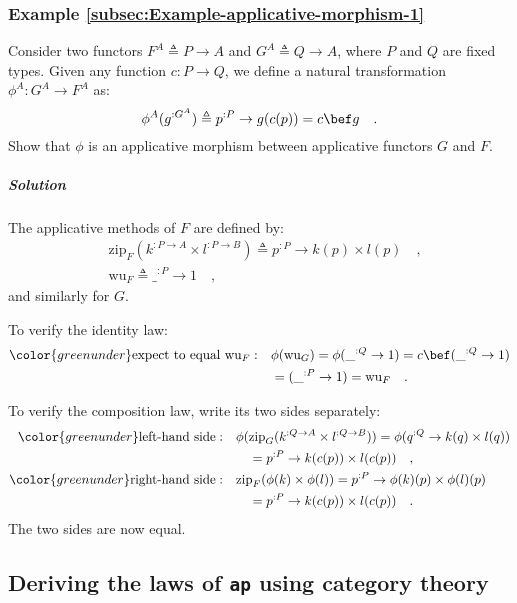 \subsubsection{Example \label{subsec:Example-applicative-morphism-1}\ref{subsec:Example-applicative-morphism-1}}

Consider two functors $F^{A}\triangleq P\rightarrow A$ and $G^{A}\triangleq Q\rightarrow A$,
where $P$ and $Q$ are fixed types. Given any function $c:P\rightarrow Q$,
we define a natural transformation $\phi^{A}:G^{A}\rightarrow F^{A}$
as:
\[
\phi^{A}(g^{:G^{A}})\triangleq p^{:P}\rightarrow g(c(p))=c\bef g\quad.
\]
Show that $\phi$ is an applicative morphism between applicative functors
$G$ and $F$.

\subparagraph{Solution}

The applicative methods of $F$ are defined by:
\begin{align*}
 & \text{zip}_{F}(k^{:P\rightarrow A}\times l^{:P\rightarrow B})\triangleq p^{:P}\rightarrow k(p)\times l(p)\quad,\\
 & \text{wu}_{F}\triangleq\_^{:P}\rightarrow1\quad,
\end{align*}
and similarly for $G$.

To verify the identity law:
\begin{align*}
{\color{greenunder}\text{expect to equal }\text{wu}_{F}:}\quad & \phi(\text{wu}_{G})=\phi(\_^{:Q}\rightarrow1)=c\bef(\_^{:Q}\rightarrow1)\\
 & =(\_^{:P}\rightarrow1)=\text{wu}_{F}\quad.
\end{align*}

To verify the composition law, write its two sides separately:
\begin{align*}
{\color{greenunder}\text{left-hand side}:}\quad & \phi(\text{zip}_{G}(k^{:Q\rightarrow A}\times l^{:Q\rightarrow B}))=\phi(q^{:Q}\rightarrow k(q)\times l(q))\\
 & \quad=p^{:P}\rightarrow k(c(p))\times l(c(p))\quad,\\
{\color{greenunder}\text{right-hand side}:}\quad & \text{zip}_{F}(\phi(k)\times\phi(l))=p^{:P}\rightarrow\phi(k)(p)\times\phi(l)(p)\\
 & \quad=p^{:P}\rightarrow k(c(p))\times l(c(p))\quad.
\end{align*}
The two sides are now equal.

\subsection{Deriving the laws of \texttt{ap} using category theory}


